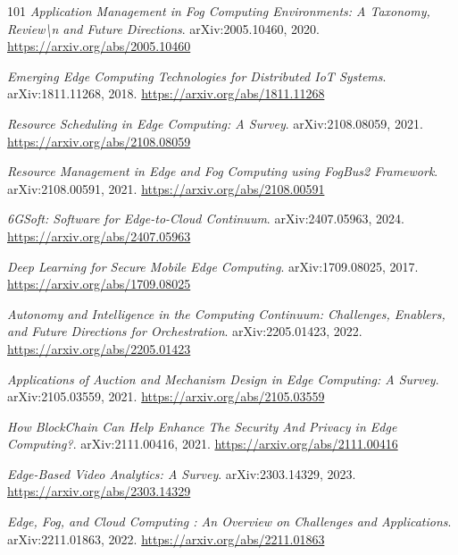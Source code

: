 \documentclass[11pt,a4paper]{article}
\begin{document}
\begin{thebibliography}{101}
\newblock \emph{Application Management in Fog Computing Environments: A Taxonomy, Review\textbackslash{}n and Future Directions}.
\newblock arXiv:2005.10460, 2020.
\newblock \url{https://arxiv.org/abs/2005.10460}

\newblock \emph{Emerging Edge Computing Technologies for Distributed IoT Systems}.
\newblock arXiv:1811.11268, 2018.
\newblock \url{https://arxiv.org/abs/1811.11268}

\newblock \emph{Resource Scheduling in Edge Computing: A Survey}.
\newblock arXiv:2108.08059, 2021.
\newblock \url{https://arxiv.org/abs/2108.08059}

\newblock \emph{Resource Management in Edge and Fog Computing using FogBus2 Framework}.
\newblock arXiv:2108.00591, 2021.
\newblock \url{https://arxiv.org/abs/2108.00591}

\newblock \emph{6GSoft: Software for Edge-to-Cloud Continuum}.
\newblock arXiv:2407.05963, 2024.
\newblock \url{https://arxiv.org/abs/2407.05963}

\newblock \emph{Deep Learning for Secure Mobile Edge Computing}.
\newblock arXiv:1709.08025, 2017.
\newblock \url{https://arxiv.org/abs/1709.08025}

\newblock \emph{Autonomy and Intelligence in the Computing Continuum: Challenges, Enablers, and Future Directions for Orchestration}.
\newblock arXiv:2205.01423, 2022.
\newblock \url{https://arxiv.org/abs/2205.01423}

\newblock \emph{Applications of Auction and Mechanism Design in Edge Computing: A Survey}.
\newblock arXiv:2105.03559, 2021.
\newblock \url{https://arxiv.org/abs/2105.03559}

\newblock \emph{How BlockChain Can Help Enhance The Security And Privacy in Edge Computing?}.
\newblock arXiv:2111.00416, 2021.
\newblock \url{https://arxiv.org/abs/2111.00416}

\newblock \emph{Edge-Based Video Analytics: A Survey}.
\newblock arXiv:2303.14329, 2023.
\newblock \url{https://arxiv.org/abs/2303.14329}

\newblock \emph{Edge, Fog, and Cloud Computing : An Overview on Challenges and Applications}.
\newblock arXiv:2211.01863, 2022.
\newblock \url{https://arxiv.org/abs/2211.01863}


\end{thebibliography}
\end{document}
